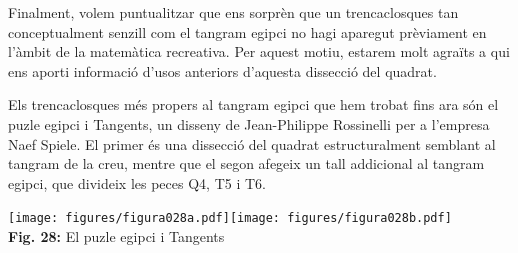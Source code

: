 \documentclass[a4paper,11pt]{article}
\begin{document}
\begin{multicols}{2}
            Finalment, volem puntualitzar que ens sorprèn que un trencaclosques tan conceptualment senzill com el tangram egipci no hagi aparegut prèviament en l'àmbit de la matemàtica recreativa. Per aquest motiu, estarem molt agraïts a qui ens aporti informació d'usos anteriors d'aquesta dissecció del quadrat.

            Els trencaclosques més propers al tangram egipci que hem trobat fins ara són el puzle egipci \cite{stegmann2019} i Tangents, un disseny de Jean-Philippe Rossinelli per a l'empresa Naef Spiele. El primer és una dissecció del quadrat estructuralment semblant al tangram de la creu, mentre que el segon afegeix un tall addicional al tangram egipci, que divideix les peces Q4, T5 i T6.

            \begin{center}
                \texttt{[image: figures/figura028a.pdf]}\qquad\texttt{[image: figures/figura028b.pdf]} \\
                \footnotesize{\textbf{Fig. 28:} El puzle egipci i Tangents}
            \end{center}

        \vfill\null
        \columnbreak
        \appendix
        
        
        \vfill\null

    \end{multicols}
\end{document}
